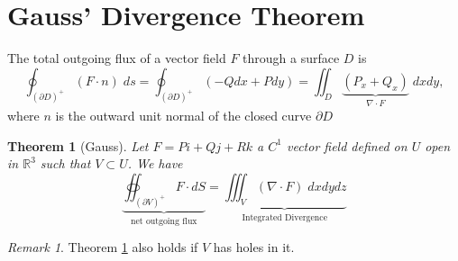 \documentclass[12pt]{book}
\newtheorem{theorem}{Theorem}[section]
\theoremstyle{definition}
\theoremstyle{remark}
\newtheorem*{remark}{Remark}
\begin{document}
\section{Gauss' Divergence Theorem}
The total outgoing flux of a vector field $F$ through a surface $D$ is
$$\oint_{(\partial D)^+} (F \cdot n) \; ds = \oint_{(\partial D)^+}(-Q dx + Pdy) = \iint_D \underbrace{(P_x + Q_x)}_{\nabla \cdot F}\; dx dy, $$
where $n$ is the outward unit normal of the closed curve $\partial D$
\begin{theorem}[Gauss] \label{Gauss}
  Let $F= Pi + Q j + Rk $ a $C^1$ vector field defined on $U$ open in $\mathbb{R}^3$ such that $V\subset U$. We have $$\underbrace{\oiint_{(\partial V)^+} F \cdot {dS}}_{\text{net outgoing flux}} = \underbrace{\iiint_{V}(\nabla \cdot {F})\; dx dy dz}_{\text{Integrated Divergence}} $$
\end{theorem}
\begin{remark} 
  Theorem \ref{Gauss} also holds if $V$ has holes in it. 
  \end{remark}
\end{document}
